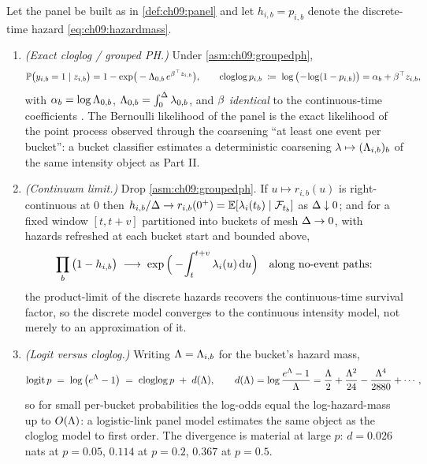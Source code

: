 \begin{theorem}\label{thm:ch09:hazardlink}
Let the panel be built as in \cref{def:ch09:panel} and let
$h_{i,b} = p_{i,b}$ denote the discrete-time hazard
\cref{eq:ch09:hazardmass}.
\begin{enumerate}[label=(\roman*)]
\item \emph{(Exact cloglog / grouped PH.)} Under
\cref{asm:ch09:groupedph},
\begin{equation}\label{eq:ch09:cloglog}
\mathbb{P}\big(y_{i,b}=1 \mid z_{i,b}\big)
= 1 - \exp\!\big(-\Lambda_{0,b}\, e^{\beta^{\top} z_{i,b}}\big),
\qquad
\operatorname{cloglog} p_{i,b}
\;\coloneqq\; \log\big(\!-\!\log(1-p_{i,b})\big)
= \alpha_b + \beta^{\top} z_{i,b},
\end{equation}
with $\alpha_b = \log \Lambda_{0,b}$, $\Lambda_{0,b} = \int_0^{\Delta}
\lambda_{0,b}$, and $\beta$ \emph{identical} to the continuous-time
coefficients \citep{prenticegloeckler1978,allison1982}. The Bernoulli
likelihood of the panel is the exact likelihood of the point process
observed through the coarsening ``at least one event per bucket'': a
bucket classifier estimates a deterministic coarsening
$\lambda \mapsto (\Lambda_{i,b})_b$ of the same intensity object as Part II.
\item \emph{(Continuum limit.)} Drop \cref{asm:ch09:groupedph}. If
$u \mapsto r_{i,b}(u)$ is right-continuous at $0$ then
$h_{i,b}/\Delta \to r_{i,b}(0^+) = \mathbb{E}[\lambda_i(t_b) \mid \mathcal{F}_{t_b}]$ as
$\Delta \downarrow 0$; and for a fixed window $[t, t+v]$ partitioned
into buckets of mesh $\Delta \to 0$, with hazards refreshed at each
bucket start and bounded above,
\[
\prod_{b} \big(1 - h_{i,b}\big) \;\longrightarrow\;
\exp\Big( -\!\int_t^{t+v} \lambda_i(u) \,\mathrm{d} u \Big)
\quad \text{along no-event paths:}
\]
the product-limit of the discrete hazards recovers the continuous-time
survival factor, so the discrete model converges to the continuous
intensity model, not merely to an approximation of it.
\item \emph{(Logit versus cloglog.)} Writing $\Lambda = \Lambda_{i,b}$ for the
bucket's hazard mass,
\begin{equation}\label{eq:ch09:linkgap}
\operatorname{logit} p \;=\; \log\big(e^{\Lambda} - 1\big)
\;=\; \operatorname{cloglog} p \;+\; d(\Lambda),
\qquad
d(\Lambda) = \log\frac{e^{\Lambda}-1}{\Lambda}
= \frac{\Lambda}{2} + \frac{\Lambda^2}{24} - \frac{\Lambda^4}{2880} + \cdots ,
\end{equation}
so for small per-bucket probabilities the log-odds equal the
log-hazard-mass up to $O(\Lambda)$: a logistic-link panel model estimates
the same object as the cloglog model to first order. The divergence is
material at large $p$: $d = 0.026$ nats at $p=0.05$, $0.114$ at
$p=0.2$, $0.367$ at $p=0.5$.
\end{enumerate}
\end{theorem}

